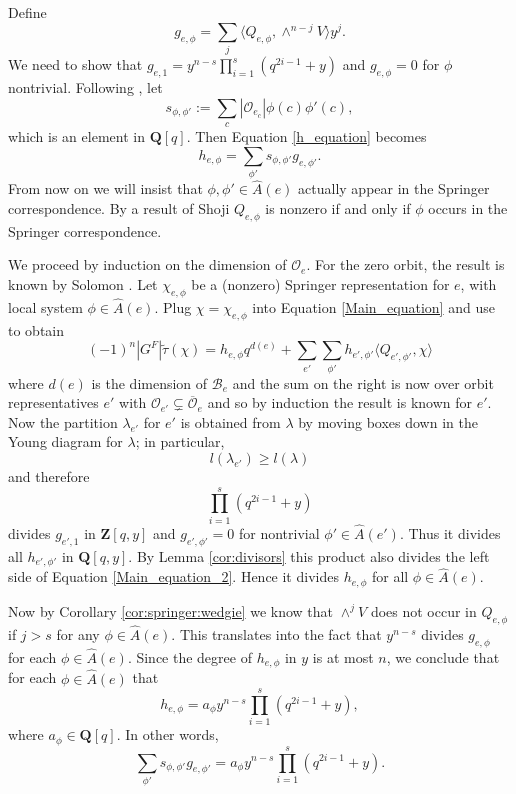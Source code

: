 \documentclass[10pt]{amsart}
\newcommand{\zz}{\mathbf Z}
\newcommand{\qq}{\mathbf Q}
\newcommand{\orbit}{\mathcal O}
\newcommand{\ar}{{\hat{A}}(e)}
\newcommand{\flag}{{\mathcal B}}
\newcommand{\ttau}{\tilde{\tau}}
\theoremstyle{plain}
\theoremstyle{definition}
\theoremstyle{remark}
\begin{document}
Define 
$$g_{e, \phi} = \sum_{j} \langle Q_{e, \phi}, \wedge^{n-j} V \rangle  y^j.$$  
We need to show that 
$g_{e, 1} = y^{n-s} \prod_{i=1}^s (q^{2i-1}+ y)$ and $g_{e, \phi} = 0$ for $\phi$ nontrivial.
Following \cite{shoji:green_classical},
let 
$$s_{\phi, \phi'} := \sum_{c} |\orbit_{e_c}| \phi(c) \phi'(c),$$
which is an element in $\qq[q]$.
Then Equation \ref{h_equation} becomes
$$h_{e, \phi} = \sum_{\phi'} s_{\phi, \phi'} g_{e, \phi'}.$$
From now on we will insist that $\phi, \phi' \in \ar$ actually appear in the Springer correspondence.
By a result of Shoji \cite{shoji:green_classical} $Q_{e,\phi}$ is nonzero if and only if 
$\phi$ occurs in the Springer correspondence.

We proceed by induction on the dimension of $\orbit_e$.   
For the zero orbit, the result is known by Solomon \cite{solomon}.
Let $\chi_{e, \phi}$ be a (nonzero) Springer representation for $e$, with local system $\phi \in \ar$.  
Plug $\chi = \chi_{e, \phi}$ into  Equation \ref{Main_equation}
and use \cite{borho-mac} to obtain
\begin{equation}  \label{Main_equation_2}
(-1)^n |G^F| \ttau(\chi) =   h_{e,\phi}  q^{d(e)} + \sum_{e'} \sum_{\phi'} h_{e', \phi'} \langle Q_{e', \phi'}, \chi \rangle 
\end{equation}
where $d(e)$ is the dimension of $\flag_e$
and the sum on the right is now over orbit representatives $e'$ with $\orbit_{e'}  \subsetneq \overline{\orbit}_e$ and so by induction the result is known for $e'$.   
Now the partition $\lambda_{e'}$ for $e'$ is obtained from $\lambda$ by moving boxes down 
in the Young diagram for $\lambda$; in particular,
$$l(\lambda_{e'}) \geq l(\lambda)$$ and therefore
$$\prod_{i=1}^s (q^{2i-1}+ y)$$ divides $g_{e',1}$ in $\zz[q,y]$
and $g_{e', \phi'} = 0$ for nontrivial $\phi' \in \hat{A}(e')$.
Thus it divides all $h_{e', \phi'}$ in $\qq[q,y]$.
By Lemma \ref{cor:divisors} this product also divides the left side of Equation \ref{Main_equation_2}.
Hence it divides $h_{e, \phi}$ for all $\phi \in \ar$.

Now by Corollary \ref{cor:springer:wedgie} we know that 
$\wedge^{j} V$ does not occur in $Q_{e, \phi}$ if $j > s$ for any $\phi \in \ar$.
This translates into the fact that $y^{n-s}$ divides $g_{e, \phi}$ for each $\phi \in \ar$.
Since the degree of $h_{e, \phi}$ in $y$ is at most $n$, we conclude that for each $\phi \in \ar$ that 
$$h_{e, \phi} =  a_{\phi} y^{n-s} \prod_{i=1}^s (q^{2i-1}+ y),$$ 
where $a_{\phi} \in \qq[q]$. %
In other words, 
$$\sum_{\phi'} s_{\phi, \phi'} g_{e,\phi'} = a_{\phi} y^{n-s} \prod_{i=1}^s (q^{2i-1}+ y).$$ 
\end{document}
